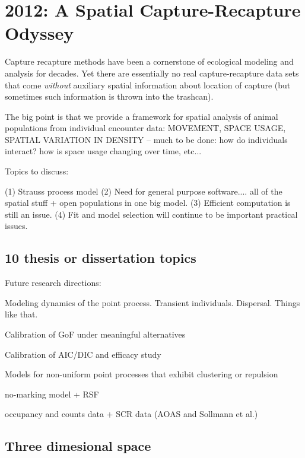 


\chapter{
 2012: A Spatial Capture-Recapture Odyssey
 }

\label{chapt.final}

\vspace{0.3cm}


\vspace{2in}

Capture recapture methods have been a cornerstone of ecological
modeling and analysis for decades.  Yet there are essentially no real
capture-recapture data sets that come {\it without} auxiliary spatial
information about location of capture (but sometimes such information
is thrown into the trashcan). 

The big point is that we provide a framework for spatial analysis of animal populations from
individual encounter data:
MOVEMENT, SPACE USAGE, SPATIAL VARIATION IN DENSITY -- 
much to be done: how do individuals interact? how is space usage changing over time, etc...


Topics to discuss:

 (1) Strauss process model
 (2) Need for general purpose software.... all of the spatial stuff + 
open populations in one big model. 
 (3) Efficient computation is still an issue.
 (4) Fit and model selection will continue to be important practical
 issues.

\section{10 thesis or dissertation topics}

Future research directions:

 Modeling dynamics of the point process. Transient individuals. 
 Dispersal. Things like that.

Calibration of GoF under meaningful alternatives

Calibration of AIC/DIC and efficacy study

Models for non-uniform point processes that exhibit clustering or
repulsion


no-marking model + RSF

occupancy and counts data + SCR data (AOAS and Sollmann et al.)





\section{Three dimesional space}

